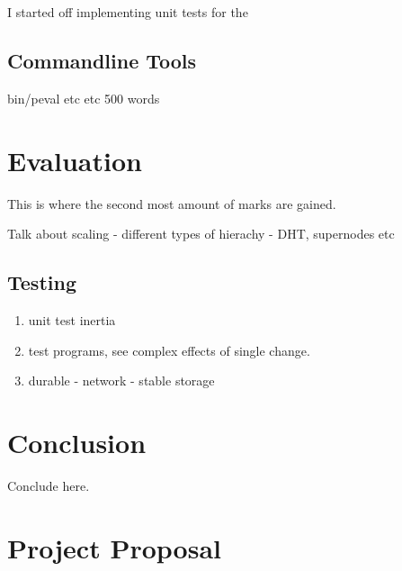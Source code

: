 \documentclass[12pt,twoside,notitlepage]{report}
\begin{document}
I started off implementing unit tests for the

\section{Commandline Tools}

bin/peval
etc etc
500 words


\cleardoublepage
\chapter{Evaluation}

This is where the second most amount of marks are gained.

Talk about scaling - different types of hierachy - DHT, supernodes etc

\section{Testing}

\begin{enumerate}
	\item unit test inertia
	\item test programs, see complex effects of single change.
	\item durable - network - stable storage
\end{enumerate}



\cleardoublepage
\chapter{Conclusion}

Conclude here.




\cleardoublepage



\cleardoublepage

\appendix

\chapter{Project Proposal}


\end{document}
